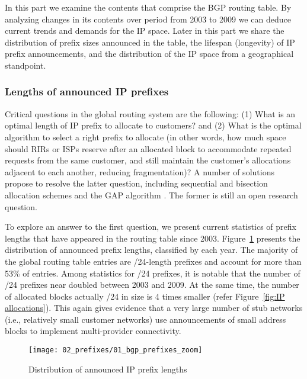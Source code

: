 In this part we examine the contents that comprise the BGP routing table. By
analyzing changes in its contents over period from 2003 to 2009 we can deduce
current trends and demands for the IP space. Later in this part we share the
distribution of prefix sizes announced in the table, the lifespan (longevity)
of IP prefix announcements, and the distribution of the IP space from a
geographical standpoint.

\subsubsection{Lengths of announced IP prefixes}

Critical questions in the global routing system are the following: (1) What is
an optimal length of IP prefix to allocate to customers? and (2) What is the
optimal algorithm to select a right prefix to allocate (in other words, how
much space should RIRs or ISPs reserve after an allocated block to accommodate
repeated requests from the same customer, and still maintain the customer's
allocations adjacent to each another, reducing fragmentation)? A number of
solutions propose to resolve the latter question, including sequential and
bisection allocation schemes and the GAP algorithm
\cite{Wang:2007:Reduce-IP-Address}. The former is still an open research
question.

To explore an answer to the first question, we present current statistics of
prefix lengths that have appeared in the routing table since 2003.
 Figure~\ref{fig:bgp prefix distribution} presents the distribution of
announced prefix lengths, classified by each year. The majority of the global
routing table entries are /24-length prefixes and account for more than 53\% of
entries. Among statistics for /24 prefixes, it is notable that the number of
/24 prefixes near doubled between 2003 and 2009. At the same time, the number
of allocated blocks actually /24 in size is 4 times smaller (refer
Figure~\ref{fig:IP allocations}). This again gives evidence that a very large
number of stub networks (i.e., relatively small customer networks) use
announcements of small address blocks to implement multi-provider connectivity.

\begin{figure}[htbp]
	\centering
		\texttt{[image: 02\_prefixes/01\_bgp\_prefixes\_zoom]}
	\caption{Distribution of announced IP prefix lengths}
	\label{fig:bgp prefix distribution}
\end{figure}

